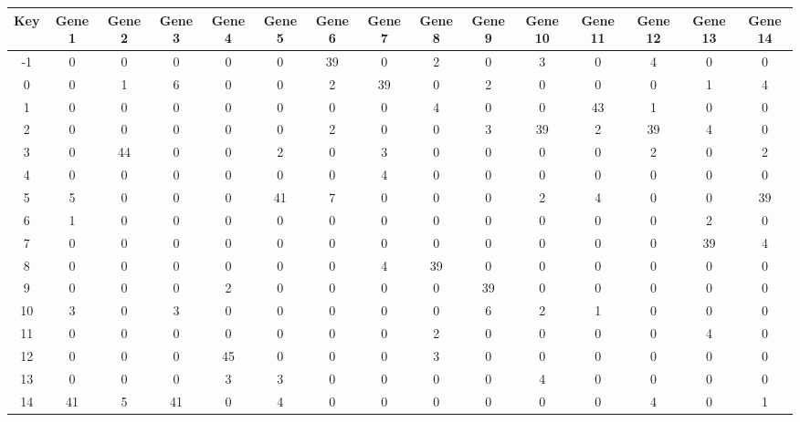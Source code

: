 \begin{tabular}{|c|c|c|c|c|c|c|c|c|c|c|c|c|c|c|}
\hline
Key & Gene 1 & Gene 2 & Gene 3 & Gene 4 & Gene 5 & Gene 6 & Gene 7 & Gene 8 & Gene 9 & Gene 10 & Gene 11 & Gene 12 & Gene 13 & Gene 14 \\
\hline
-1 & 0 & 0 & 0 & 0 & 0 & 39 & 0 & 2 & 0 & 3 & 0 & 4 & 0 & 0 \\
0 & 0 & 1 & 6 & 0 & 0 & 2 & 39 & 0 & 2 & 0 & 0 & 0 & 1 & 4 \\
1 & 0 & 0 & 0 & 0 & 0 & 0 & 0 & 4 & 0 & 0 & 43 & 1 & 0 & 0 \\
2 & 0 & 0 & 0 & 0 & 0 & 2 & 0 & 0 & 3 & 39 & 2 & 39 & 4 & 0 \\
3 & 0 & 44 & 0 & 0 & 2 & 0 & 3 & 0 & 0 & 0 & 0 & 2 & 0 & 2 \\
4 & 0 & 0 & 0 & 0 & 0 & 0 & 4 & 0 & 0 & 0 & 0 & 0 & 0 & 0 \\
5 & 5 & 0 & 0 & 0 & 41 & 7 & 0 & 0 & 0 & 2 & 4 & 0 & 0 & 39 \\
6 & 1 & 0 & 0 & 0 & 0 & 0 & 0 & 0 & 0 & 0 & 0 & 0 & 2 & 0 \\
7 & 0 & 0 & 0 & 0 & 0 & 0 & 0 & 0 & 0 & 0 & 0 & 0 & 39 & 4 \\
8 & 0 & 0 & 0 & 0 & 0 & 0 & 4 & 39 & 0 & 0 & 0 & 0 & 0 & 0 \\
9 & 0 & 0 & 0 & 2 & 0 & 0 & 0 & 0 & 39 & 0 & 0 & 0 & 0 & 0 \\
10 & 3 & 0 & 3 & 0 & 0 & 0 & 0 & 0 & 6 & 2 & 1 & 0 & 0 & 0 \\
11 & 0 & 0 & 0 & 0 & 0 & 0 & 0 & 2 & 0 & 0 & 0 & 0 & 4 & 0 \\
12 & 0 & 0 & 0 & 45 & 0 & 0 & 0 & 3 & 0 & 0 & 0 & 0 & 0 & 0 \\
13 & 0 & 0 & 0 & 3 & 3 & 0 & 0 & 0 & 0 & 4 & 0 & 0 & 0 & 0 \\
14 & 41 & 5 & 41 & 0 & 4 & 0 & 0 & 0 & 0 & 0 & 0 & 4 & 0 & 1 \\
\hline
\end{tabular}